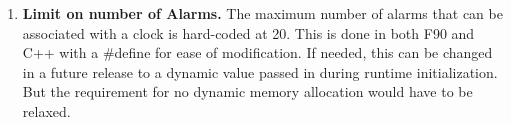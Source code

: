 
\begin{enumerate}

\item {\bf Limit on number of Alarms.}  The maximum number of alarms that 
can be associated with a clock is hard-coded
at 20.  This is done in both F90 and  C++ with a \#define for ease of
modification.  If needed, this can be changed in a future release to a 
dynamic value passed in during runtime initialization.  But the requirement 
for no dynamic memory allocation would have to be relaxed.

\end{enumerate}
